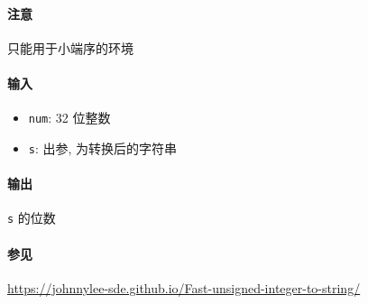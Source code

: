 \paragraph{注意}

只能用于小端序的环境

\paragraph{输入}

\begin{itemize}
    \item \verb|num|: 32 位整数
    \item \verb|s|: 出参, 为转换后的字符串
\end{itemize}

\paragraph{输出}

\verb|s| 的位数

\paragraph{参见}

\url{https://johnnylee-sde.github.io/Fast-unsigned-integer-to-string/}
